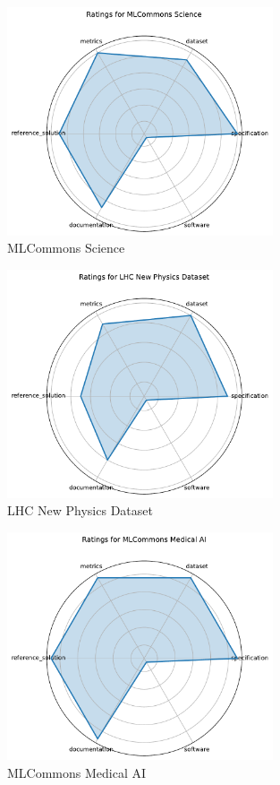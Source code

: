 \documentclass{article}
\begin{document}
\begin{figure}[h!]
  \centering
  \includegraphics[width=0.7\textwidth]{MLCommons Science_radar.pdf}
  \caption{MLCommons Science}
\end{figure}

\begin{figure}[h!]
  \centering
  \includegraphics[width=0.7\textwidth]{LHC New Physics Dataset_radar.pdf}
  \caption{LHC New Physics Dataset}
\end{figure}

\begin{figure}[h!]
  \centering
  \includegraphics[width=0.7\textwidth]{MLCommons Medical AI_radar.pdf}
  \caption{MLCommons Medical AI}
\end{figure}
\end{document}
